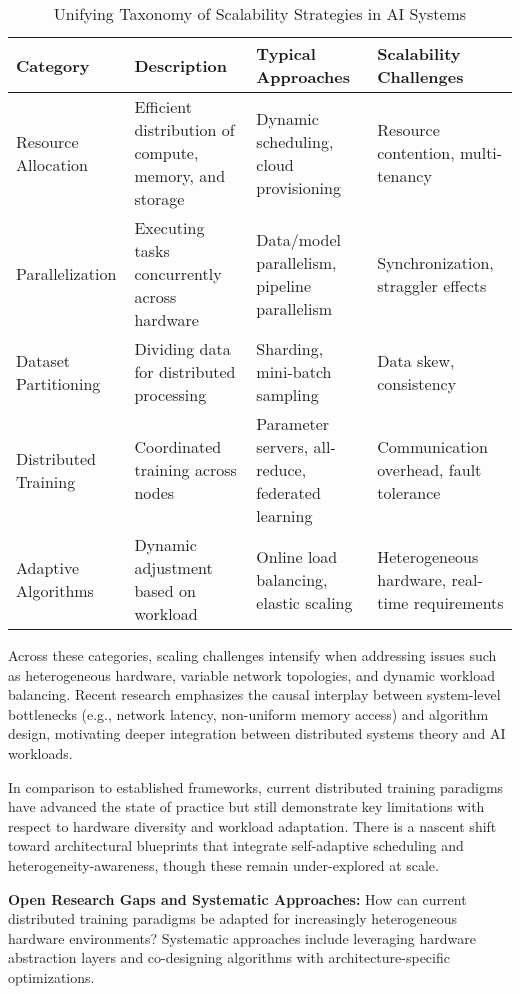 \documentclass[sigconf]{acmart}
\begin{document}
\begin{table*}[htbp]
\centering
\caption{Unifying Taxonomy of Scalability Strategies in AI Systems}
\label{tab:scalability-taxonomy}
\begin{adjustbox}{max width=\textwidth}
\begin{tabular}{@{}llll@{}}
\toprule
Category & Description & Typical Approaches & Scalability Challenges \\ \midrule
Resource Allocation & Efficient distribution of compute, memory, and storage & Dynamic scheduling, cloud provisioning & Resource contention, multi-tenancy \\
Parallelization & Executing tasks concurrently across hardware & Data/model parallelism, pipeline parallelism & Synchronization, straggler effects \\
Dataset Partitioning & Dividing data for distributed processing & Sharding, mini-batch sampling & Data skew, consistency \\
Distributed Training & Coordinated training across nodes & Parameter servers, all-reduce, federated learning & Communication overhead, fault tolerance \\
Adaptive Algorithms & Dynamic adjustment based on workload & Online load balancing, elastic scaling & Heterogeneous hardware, real-time requirements \\
\bottomrule
\end{tabular}
\end{adjustbox}
\end{table*}

Across these categories, scaling challenges intensify when addressing issues such as heterogeneous hardware, variable network topologies, and dynamic workload balancing. Recent research emphasizes the causal interplay between system-level bottlenecks (e.g., network latency, non-uniform memory access) and algorithm design, motivating deeper integration between distributed systems theory and AI workloads.

In comparison to established frameworks, current distributed training paradigms have advanced the state of practice but still demonstrate key limitations with respect to hardware diversity and workload adaptation. There is a nascent shift toward architectural blueprints that integrate self-adaptive scheduling and heterogeneity-awareness, though these remain under-explored at scale.

\textbf{Open Research Gaps and Systematic Approaches:}
How can current distributed training paradigms be adapted for increasingly heterogeneous hardware environments? Systematic approaches include leveraging hardware abstraction layers and co-designing algorithms with architecture-specific optimizations.
\end{document}
